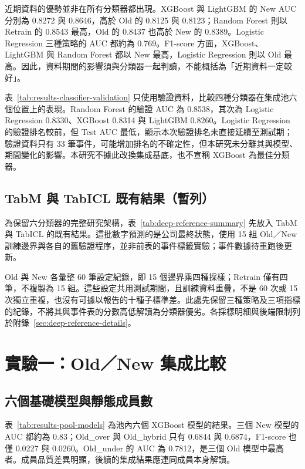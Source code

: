 近期資料的優勢並非在所有分類器都出現。XGBoost 與 LightGBM 的 New AUC 分別為 0.8272 與 0.8646，高於 Old 的 0.8125 與 0.8123；Random Forest 則以 Retrain 的 0.8543 最高，Old 的 0.8437 也高於 New 的 0.8389。Logistic Regression 三種策略的 AUC 都約為 0.769。F1-score 方面，XGBoost、LightGBM 與 Random Forest 都以 New 最高，Logistic Regression 則以 Old 最高。因此，資料期間的影響須與分類器一起判讀，不能概括為「近期資料一定較好」。

表~\ref{tab:results-classifier-validation} 只使用驗證資料，比較四種分類器在集成池六個位置上的表現。Random Forest 的驗證 AUC 為 0.8538，其次為 Logistic Regression 0.8330、XGBoost 0.8314 與 LightGBM 0.8260。Logistic Regression 的驗證排名較前，但 Test AUC 最低，顯示本次驗證排名未直接延續至測試期；驗證資料只有 33 筆事件，可能增加排名的不確定性，但本研究未分離其與模型、期間變化的影響。本研究不據此改換集成基底，也不宣稱 XGBoost 為最佳分類器。



\subsection{TabM 與 TabICL 既有結果（暫列）}\label{sec:results-deep-reference}

為保留六分類器的完整研究架構，表~\ref{tab:deep-reference-summary} 先放入 TabM 與 TabICL 的既有結果。這批數字預測的是公司最終狀態，使用 15 組 Old／New 訓練邊界與各自的舊驗證程序，並非前表的事件標籤實驗；事件數據待重跑後更新。



Old 與 New 各彙整 60 筆設定紀錄，即 15 個邊界乘四種採樣；Retrain 僅有四筆，不複製為 15 組。這些設定共用測試期間，且訓練資料重疊，不是 60 次或 15 次獨立重複，也沒有可據以報告的十種子標準差。此處先保留三種策略及三項指標的紀錄，不將其與事件表的分數高低解讀為分類器優劣。各採樣明細與後端限制列於附錄~\ref{sec:deep-reference-details}。

\section{實驗一：Old／New 集成比較}\label{sec:results-experiment1}

\subsection{六個基礎模型與靜態成員數}

表~\ref{tab:results-pool-models} 為池內六個 XGBoost 模型的結果。三個 New 模型的 AUC 都約為 0.83；Old\_over 與 Old\_hybrid 只有 0.6844 與 0.6874，F1-score 也僅 0.0227 與 0.0260。Old\_under 的 AUC 為 0.7812，是三個 Old 模型中最高者。成員品質差異明顯，後續的集成結果應連同成員本身解讀。

